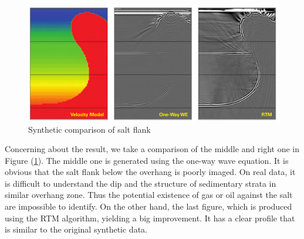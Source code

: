 \begin{figure}[h]
  \hfill
  \includegraphics[scale=.25]{img/velocity_model.png}
  \caption{Synthetic comparison of salt flank}
  \label{fig:comparison}
\end{figure}

Concerning about the result, we take a comparison of the middle and right
one in Figure (\ref{fig:comparison}). The middle one is generated using the
one-way wave equation. It is obvious that the salt flank below the overhang
is poorly imaged. On real data, it is difficult to understand the dip and
the structure of sedimentary strata in similar overhang zone. Thus the
potential existence of gas or oil against the salt are impossible to
identify. On the other hand, the last figure, which is produced using the
RTM algorithm, yielding a big improvement. It has a clear profile that is
similar to the original synthetic data.
